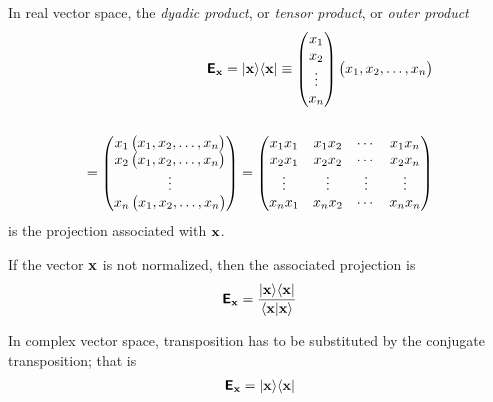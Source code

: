 In real vector space, the {\em dyadic product}, or {\em tensor product}, or {\em outer product}
\begin{equation}
\begin{split}
\textsf{\textbf{E}}_{\bf x} =   \vert{\bf x}\rangle \langle {\bf x}\vert
\equiv
\begin{pmatrix}
x_1\\
x_2\\
\vdots \\
x_n
\end{pmatrix}
\begin{pmatrix}x_1,x_2,\ldots ,x_n\end{pmatrix}\\
\\
=
\begin{pmatrix}
x_1\begin{pmatrix}x_1,x_2,\ldots ,x_n\end{pmatrix}\\
x_2\begin{pmatrix}x_1,x_2,\ldots ,x_n\end{pmatrix}\\
\vdots  \\
x_n\begin{pmatrix}x_1,x_2,\ldots ,x_n \end{pmatrix}
\end{pmatrix}
=
\begin{pmatrix}
x_1x_1&x_1x_2& \cdots&x_1x_n\\
x_2x_1&x_2x_2& \cdots&x_2x_n\\
\vdots & \vdots & \vdots &\vdots \\
x_nx_1&x_nx_2& \cdots&x_nx_n
\end{pmatrix}
\end{split}
\label{2016-pu-book-chapter-qm.tex-dp}
\end{equation}
is the projection
associated with ${\bf x}$.

If the vector ${\bf x}$ is not normalized,
then the associated projection is
\begin{equation}
\textsf{\textbf{E}}_{\bf x} = \frac{\vert{\bf x}\rangle \langle {\bf x}\vert}{\langle {\bf x}\vert {\bf x}\rangle}
\end{equation}



In complex vector space, transposition has to be substituted by the conjugate transposition;
that is
\begin{equation}
\begin{split}
\textsf{\textbf{E}}_{\bf x} = \vert{\bf x}\rangle \langle {\bf x}\vert
\end{split}
\end{equation}




